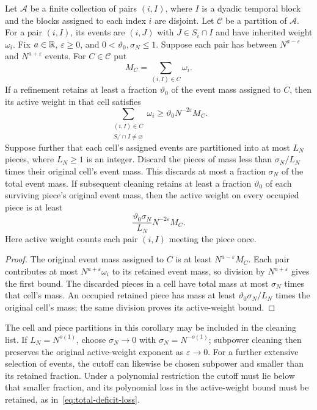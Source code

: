 \begin{corollary}
\label{cor:active-weight-cleaning}
Let $\mathcal A$ be a finite collection of pairs $(i,I)$, where $I$ is a
dyadic temporal block and the blocks assigned to each index $i$ are
disjoint. Let $\mathcal C$ be a partition of $\mathcal A$. For a pair
$(i,I)$, its events are $(i,J)$ with $J\in S_i\cap I$ and have inherited
weight $\omega_i$. Fix $a\in\mathbb R$, $\varepsilon\ge0$, and
$0<\vartheta_0,\sigma_N\le1$. Suppose each pair has between
$N^{a-\varepsilon}$ and $N^{a+\varepsilon}$ events.
For $C\in\mathcal C$ put
\[
 M_C=\sum_{(i,I)\in C}\omega_i.
\]
If a refinement retains at least a fraction $\vartheta_0$ of the event
mass assigned to $C$, then its active weight in that cell satisfies
\[
 \sum_{\substack{(i,I)\in C\\S_i'\cap I\ne\varnothing}}\omega_i
 \ge\vartheta_0N^{-2\varepsilon}M_C.
\]
Suppose further that each cell's assigned events are partitioned into at
most $L_N$ pieces, where $L_N\ge1$ is an integer. Discard the pieces of mass less than
$\sigma_N/L_N$ times their original cell's event mass. This discards at
most a fraction $\sigma_N$ of the total event mass. If subsequent cleaning
retains at least a fraction $\vartheta_0$ of each surviving piece's
original event mass, then the active weight on every occupied piece is
at least
\[
 \frac{\vartheta_0\sigma_N}{L_N}N^{-2\varepsilon}M_C.
\]
Here active weight counts each pair $(i,I)$ meeting the piece once.
\end{corollary}

\begin{proof}
The original event mass assigned to $C$ is at least
$N^{a-\varepsilon}M_C$. Each pair contributes at most
$N^{a+\varepsilon}\omega_i$ to its retained event mass, so division by
$N^{a+\varepsilon}$ gives the first bound. The discarded pieces in a
cell have total mass at most $\sigma_N$ times that cell's mass.
An occupied retained piece has mass at least
$\vartheta_0\sigma_N/L_N$ times the original cell's mass; the same
division proves its active-weight bound.
\end{proof}

The cell and piece partitions in this corollary may be included in the
cleaning list. If $L_N=N^{o(1)}$, choose
$\sigma_N\to0$ with $\sigma_N=N^{-o(1)}$; subpower cleaning then
preserves the original active-weight exponent as $\varepsilon\to0$.
For a further extensive selection of events, the cutoff can likewise be
chosen subpower and smaller than its retained fraction. Under a
polynomial restriction the cutoff must lie below that smaller fraction,
and its polynomial loss in the active-weight bound must be retained,
as in~\eqref{eq:total-deficit-loss}.

